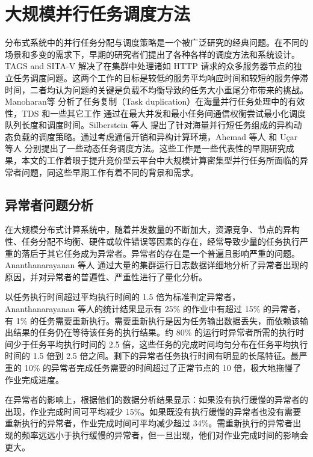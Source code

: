 \section{大规模并行任务调度方法}
分布式系统中的并行任务分配与调度策略是一个被广泛研究的经典问题。在不同的场景和多变的需求下，早期的研究者们提出了各种各样的调度方法和系统设计。TAGS \cite{balter} and SITA-V
\cite{Crovella:1998:TAD:277851.277942} 解决了在集群中处理诸如 HTTP 请求的众多服务器节点的独立任务调度问题。这两个工作的目标是较低的服务平均响应时间和较短的服务停滞时间，二者均认为问题的关键是负载不均衡导致的任务大小重尾分布带来的挑战。Manoharan等 \cite{Manoharan:2001:ETD:373047.373064} 分析了任务复制（Task duplication）在海量并行任务处理中的有效性，TDS \cite{rohtua} 和一些其它工作 \cite{ahmad, Dogan:2002:LDB:850943.853100} 通过在最大并发和最小任务间通信权衡尝试最小化调度队列长度和调度时间。Silberstein 等人 \cite{silberstein} 提出了针对海量并行短任务组成的异构动态负载的调度策略。通过考虑通信开销和异构计算环境，Ahemad 等人 \cite{Ahmad:1991:SLB:126283.126284} 和 Uçar 等人 \cite{ucar} 分别提出了一些动态任务调度方法。这些工作是一些代表性的早期研究成果，本文的工作着眼于提升竞价型云平台中大规模计算密集型并行任务所面临的异常者问题，同这些早期工作有着不同的背景和需求。

\subsection{异常者问题分析}
在大规模分布式计算系统中，随着并发数量的不断加大，资源竞争、节点的异构性、任务分配不均衡、硬件或软件错误等因素的存在，经常导致少量的任务执行严重的落后于其它任务成为异常者。异常者的存在是一个普遍且影响严重的问题。Ananthanarayanan 等人 \cite{Ananthanarayanan:2010:ROM:1924943.1924962} 通过大量的集群运行日志数据详细地分析了异常者出现的原因，并对异常者的普遍性、严重性进行了量化分析。

以任务执行时间超过平均执行时间的 1.5 倍为标准判定异常者，Ananthanarayanan 等人的统计结果显示有 25\% 的作业中有超过 15\% 的异常者，有 1\% 的任务需要重新执行。需要重新执行是因为任务输出数据丢失，而依赖该输出结果的任务仍在等待该任务的执行结果。约 80\% 的运行时异常者所需的执行时间少于任务平均执行时间的 2.5 倍，这些任务的完成时间均匀分布在任务平均执行时间的 1.5 倍到 2.5 倍之间。剩下的异常者任务执行时间有明显的长尾特征。最严重的 10\% 的异常者完成任务需要的时间超过了正常节点的 10 倍，极大地拖慢了作业完成进度。

在异常者的影响上，根据他们的数据分析结果显示：如果没有执行缓慢的异常者的出现，作业完成时间可平均减少 15\%。如果既没有执行缓慢的异常者也没有需要重新执行的异常者，作业完成时间可平均减少超过 34\%。需重新执行的异常者出现的频率远远小于执行缓慢的异常者，但一旦出现，他们对作业完成时间的影响会更大。

